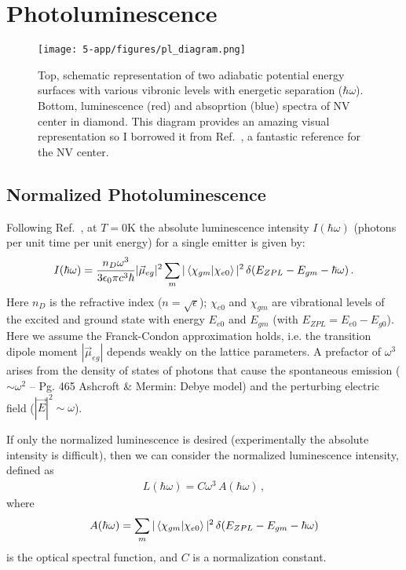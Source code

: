 \newcommand{\hw}{\hbar\omega}

\chapter{Photoluminescence}

\begin{figure}[H]
    \centering
    \texttt{[image: 5-app/figures/pl\_diagram.png]}
    \caption{Top, schematic representation of two adiabatic potential energy surfaces with various vibronic levels with energetic separation ($\hbar\omega$). Bottom, luminescence (red) and absoprtion (blue) spectra of NV center in diamond. This diagram provides an amazing visual representation so I borrowed it from Ref.~\cite{gali2019ab}, a fantastic reference for the NV center.}
    \label{fig:screen}
\end{figure}

\section{Normalized Photoluminescence}

Following Ref.~\cite{alkauskas2014first1}, at $T= 0$K the absolute luminescence intensity $I(\hw)$ (photons per unit time per unit energy) for a single emitter is given by:
\begin{align}
    I(\hw) = \frac{n_D\omega^3}{3\epsilon_0\pi c^3\hbar} |\vec{\mu}_{eg}|^2
        \sum_m |\braket{\chi_{gm}|\chi_{e0}}|^2 \, \delta(E_{ZPL} - E_{gm} - \hw)\, .
    \label{eq:Ihw}
\end{align}
Here $n_D$ is the refractive index ($n = \sqrt{\epsilon}$); $\chi_{e0}$ and $\chi_{gm}$ are vibrational levels of the excited and ground state with energy $E_{e0}$ and $E_{gm}$ (with $E_{ZPL} = E_{e0} - E_{g0}$). Here we assume the Franck-Condon approximation holds, i.e. the transition dipole moment $|\vec{\mu}_{eg}|$ depends weakly on the lattice parameters. A prefactor of $\omega^3$ arises from the density of states of photons that cause the spontaneous emission ($\sim\omega^2$ -- Pg. 465 Ashcroft \& Mermin: Debye model) and the perturbing electric field ($|\vec{E}|^2\sim\omega$).

If only the normalized luminescence is desired (experimentally the absolute intensity is difficult), then we can consider the normalized luminescence intensity, defined as
\begin{align}
    L(\hw) = C \omega^3 \, A(\hw)\, ,
    \label{eq:Lhw}
\end{align}
where
\begin{align}
    A(\hw) = \sum_m |\braket{\chi_{gm}|\chi_{e0}}|^2 \, \delta(E_{ZPL} - E_{gm} - \hw)
    \label{eq:Ahw}
\end{align}
is the optical spectral function, and $C$ is a normalization constant.


